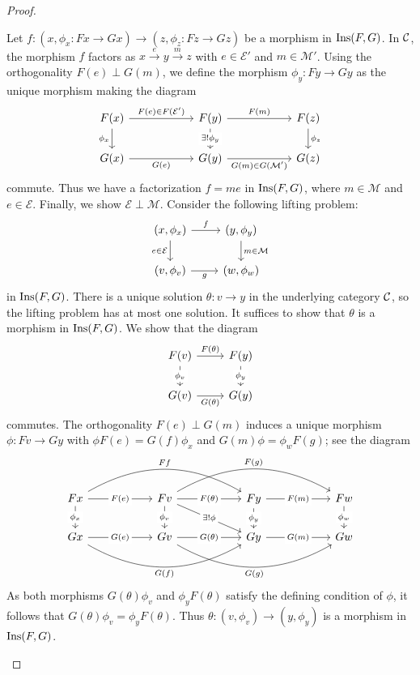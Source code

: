 \begin{proof}
\begin{enumerate}
   Let $f\colon (x,\phi_x\colon Fx\to Gx)\to (z,\phi_z\colon Fz\to Gz)$ be a morphism in $\mathrm{Ins}(F,G)$. In $\mathcal{C}$, the morphism $f$ factors as $x\xrightarrow{e}y\xrightarrow{m}z$ with $e\in \mathcal{E}'$ and $m\in \mathcal{M}'$. Using the orthogonality $F(e)\perp G(m)$, we define the morphism $\phi_y\colon Fy\to Gy$ as the unique morphism making the diagram
   \[
   \begin{tikzcd}[column sep = 2 cm]
F(x) \arrow[d, "\phi_x"'] \arrow[r, "F(e)\in F(\E')"] & F(y) \arrow[d, "\exists!\phi_y" description] \arrow[r, "F(m)"] & F(z) \arrow[d, "\phi_z"] \\
G(x) \arrow[r, "G(e)"']                              & G(y) \arrow[r, "G(m)\in G(\M')"']                                   & G(z)
\end{tikzcd}
   \]
   commute. Thus we have a factorization $f = me$ in $\mathrm{Ins}(F,G)$, where $m\in \mathcal{M}$ and $e\in \mathcal{E}$. Finally, we show $\mathcal{E}\perp \mathcal{M}$. Consider the following lifting problem:
   \[
   \begin{tikzcd}
(x,\phi_x) \arrow[d, "e\in \mathcal{E}"'] \arrow[r, "f"] & (y,\phi_y) \arrow[d, "m\in \mathcal{M}"] \\
(v,\phi_v) \arrow[r, "g"']                      & (w,\phi_w)
\end{tikzcd}
   \]
   in $\mathrm{Ins}(F,G)$. There is a unique solution $\theta\colon v\to y$ in the underlying category $\mathcal{C}$, so the lifting problem has at most one solution. It suffices to show that $\theta$ is a morphism in $\mathrm{Ins}(F,G)$. We show that the diagram
   \[
   \begin{tikzcd}
F(v) \arrow[d, "\phi_v" description] \arrow[r, "F(\theta)"] & F(y) \arrow[d, "\phi_y" description] \\
G(v) \arrow[r, "G(\theta)"']                                  & G(y)
\end{tikzcd}
   \]
   commutes. The orthogonality $F(e)\perp G(m)$ induces a unique morphism $\phi\colon Fv\to Gy$ with $\phi F(e) = G(f)\phi_x$ and $G(m)\phi = \phi_w F(g)$; see the diagram
   \[
\begin{tikzcd}[column sep = 2 cm]
Fx \arrow[d, "\phi_x" description] \arrow[r, "F(e)" description] \arrow[rr, "Ff", bend left] & Fv \arrow[r, "F(\theta)" description] \arrow[d, "\phi_v" description] \arrow[rd, "\exists!\phi" description] \arrow[rr, "F(g)", bend left] & Fy \arrow[r, "F(m)" description] \arrow[d, "\phi_y" description] & Fw \arrow[d, "\phi_w" description] \\
Gx \arrow[r, "G(e)" description] \arrow[rr, "G(f)"', bend right]                                & Gv \arrow[r, "G(\theta)" description] \arrow[rr, "G(g)"', bend right]                                                                         & Gy \arrow[r, "G(m)" description]                                    & Gw
\end{tikzcd}
\]
   As both morphisms $G(\theta)\phi_v$ and $\phi_yF(\theta)$ satisfy the defining condition of $\phi$, it follows that $G(\theta)\phi_v = \phi_y F(\theta)$. Thus $\theta\colon (v,\phi_v)\to (y,\phi_y)$ is a morphism in $\mathrm{Ins}(F,G)$.


\end{enumerate}
\end{proof}
